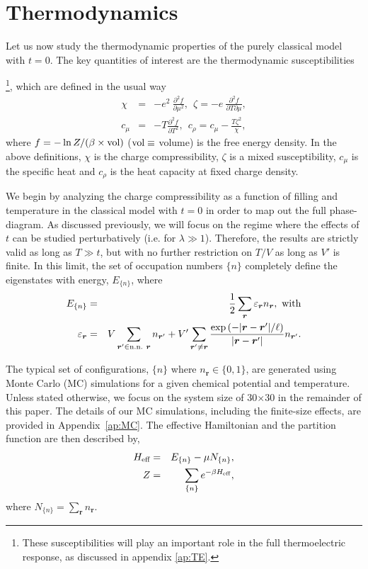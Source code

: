 \documentclass[aps,prx,onecolumn,amsmath,nofootinbib,amssymb,11pt]{revtex4-1}
\renewcommand{\vec}[1]{\boldsymbol{#1}}
\def \ve {\varepsilon}
\def \r {{\vec r}}
\def \ve {\varepsilon}
\def \beq {\begin{eqnarray}}
\def \eeq {\end{eqnarray}}
\def \tn {\textnormal}
\begin{document}
\section{\textsf{Thermodynamics}}
\label{sec:thermo}

Let us now study the thermodynamic properties of the purely classical model with $t=0$. The key quantities of interest are the thermodynamic susceptibilities {\footnote{\textsf{These susceptibilities will play an important role in the full thermoelectric response, as discussed in appendix \ref{ap:TE}.}}, which are defined in the usual way
\begin{subequations}
\beq
\chi &=& -e^2 ~\frac{\partial^2 f}{\partial \mu^2},~~\zeta = -e~\frac{\partial^2 f}{\partial T\partial \mu},\\
c_\mu &=& -T \frac{\partial^2 f}{\partial T^2},~~c_{\rho} = c_\mu -\frac{T \zeta ^2}{\chi}, 
\eeq
\label{eqn:suscept}
\end{subequations}
where $f=-\ln Z/(\beta\times\tn{vol})$ ($\tn{vol}\equiv$ volume) is the free energy density. In the above definitions, $\chi$ is the charge compressibility, $\zeta$ is a mixed susceptibility, $c_\mu$ is the specific heat and $c_\rho$ is the heat capacity at fixed charge density.  

We begin by analyzing the charge compressibility as a function of filling and temperature in the classical model with $t=0$ in order to map out the full phase-diagram. As discussed previously, we will focus on the regime where the effects of $t$ can be studied perturbatively (i.e. for $\lambda\gg1$). Therefore, the results are strictly valid as long as $T\gg t$, but with no further restriction on $T/V$ as long as $V'$ is finite. In this limit, the set of occupation numbers $\{n\}$ completely define the eigenstates with energy, $E_{\{n\}}$, where
\beq
E_{\{n\}} &=& \frac{1}{2}\sum_\r  \ve_\r n_\r,~\tn{with} \label{En}\\
\ve_\r &=& V \sum_{\r'\in \tn{n.n.}~\r} n_{\r'} + V' \sum_{\r'\neq \r}\frac{\exp{\left( -|\r-\r'|/\ell\right) }}{|\r-\r'|} n_{\r'}.
\label{eqn:loc_ene}
\eeq


The typical set of configurations, $\{n\}$ where $n_\r\in  \{ 0,1 \}$, are generated using Monte Carlo (MC) simulations for a given chemical potential and temperature. Unless stated otherwise, we focus on the system size of 30$\times$30 in the remainder of this paper. The details of our MC simulations, including the finite-size effects, are provided in  Appendix~\ref{ap:MC}. The effective Hamiltonian and the partition function are then described by, 
\beq
H_\tn{eff} &=& E_{\{n\}} - \mu N_{\{n\}}, \\
Z &=& \sum_{\{n\}} e^{-\beta H_\tn{eff}},
\label{Heff}
\eeq
where $N_{\{n\}}=\sum_\r n_\r$.  
 
}
\end{document}
